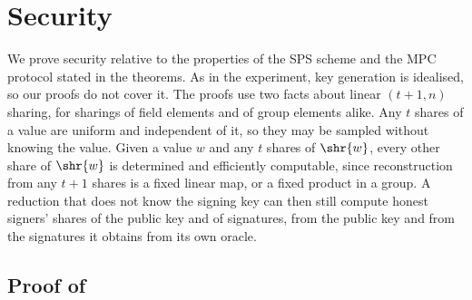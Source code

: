 \section{Security}\label{sec:tsps-security}

We prove security relative to the properties of the SPS scheme and the MPC
protocol stated in the theorems. As in the experiment, key generation is
idealised, so our proofs do not cover it. The proofs use two facts about linear
$(t+1, n)$ sharing, for sharings of field elements and of group elements alike.
Any $t$ shares of a value are uniform and independent of it, so they may be
sampled without knowing the value. Given a value $w$ and any $t$ shares of
$\shr{w}$, every other share of $\shr{w}$ is determined and efficiently
computable, since reconstruction from any $t+1$ shares is a fixed linear map,
or a fixed product in a group. A reduction that does not know the signing
key can then still compute honest signers' shares of the public key and of
signatures, from the public key and from the signatures it obtains from its own
oracle.

\subsection{Proof of }\label{sec:tsps-proof-construction}

